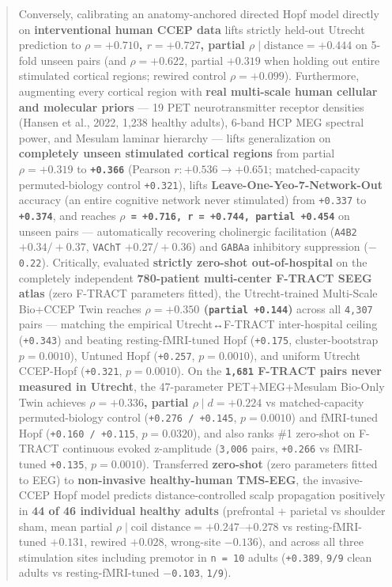 \documentclass[11pt,a4paper]{article}
\begin{document}
\begin{abstract}
Conversely, calibrating an anatomy-anchored directed Hopf model directly on \textbf{interventional human CCEP data} lifts strictly held-out Utrecht prediction to \textbf{$\rho = +0.710$, $r = +0.727$, partial $\rho \mid \text{distance} = +0.444$} on 5-fold unseen pairs (and $\rho = +0.622$, partial $+0.319$ when holding out entire stimulated cortical regions; rewired control $\rho = +0.099$). Furthermore, augmenting every cortical region with \textbf{real multi-scale human cellular and molecular priors} --- 19 PET neurotransmitter receptor densities (Hansen et al., 2022, 1,238 healthy adults), 6-band HCP MEG spectral power, and Mesulam laminar hierarchy --- lifts generalization on \textbf{completely unseen stimulated cortical regions} from partial $\rho = +0.319$ to \textbf{\texttt{+0.366}} (Pearson $r: +0.536 \to +0.651$; matched-capacity permuted-biology control \texttt{+0.321}), lifts \textbf{Leave-One-Yeo-7-Network-Out} accuracy (an entire cognitive network never stimulated) from \texttt{+0.337} to \textbf{\texttt{+0.374}}, and reaches \textbf{\texttt{$\rho$ = +0.716, r = +0.744, partial +0.454}} on unseen pairs --- automatically recovering cholinergic facilitation (\texttt{A4B2} $+0.34/+0.37$, \texttt{VAChT} $+0.27/+0.36$) and \texttt{GABAa} inhibitory suppression (\texttt{$-$0.22}). Critically, evaluated \textbf{strictly zero-shot out-of-hospital} on the completely independent \textbf{780-patient multi-center F-TRACT SEEG atlas} (zero F-TRACT parameters fitted), the Utrecht-trained Multi-Scale Bio+CCEP Twin reaches \textbf{$\rho = +0.350$ (\texttt{partial +0.144})} across all \texttt{4,307} pairs --- matching the empirical Utrecht↔F-TRACT inter-hospital ceiling (\texttt{+0.343}) and beating resting-fMRI-tuned Hopf (\texttt{+0.175}, cluster-bootstrap $p = 0.0010$), Untuned Hopf (\texttt{+0.257}, $p = 0.0010$), and uniform Utrecht CCEP-Hopf (\texttt{+0.321}, $p = 0.0010$). On the \textbf{\texttt{1,681} F-TRACT pairs never measured in Utrecht}, the 47-parameter PET+MEG+Mesulam Bio-Only Twin achieves \textbf{$\rho = +0.336$, partial $\rho \mid d = +0.224$} vs matched-capacity permuted-biology control (\texttt{+0.276 / +0.145}, $p = 0.0010$) and fMRI-tuned Hopf (\texttt{+0.160 / +0.115}, $p = 0.0320$), and also ranks \#1 zero-shot on F-TRACT continuous evoked z-amplitude (\texttt{3,006} pairs, \texttt{+0.266} vs fMRI-tuned \texttt{+0.135}, $p = 0.0010$). Transferred \textbf{zero-shot} (zero parameters fitted to EEG) to \textbf{non-invasive healthy-human TMS-EEG}, the invasive-CCEP Hopf model predicts distance-controlled scalp propagation positively in \textbf{44 of 46 individual healthy adults} (prefrontal + parietal vs shoulder sham, mean partial $\rho \mid \text{coil distance} = +0.247$--$+0.278$ vs resting-fMRI-tuned $+0.131$, rewired $+0.028$, wrong-site $-0.136$), and across all three stimulation sites including premotor in \texttt{n = 10} adults (\texttt{+0.389}, \texttt{9/9} clean adults vs resting-fMRI-tuned \texttt{$-$0.103}, \texttt{1/9}).


\end{abstract}
\end{document}
